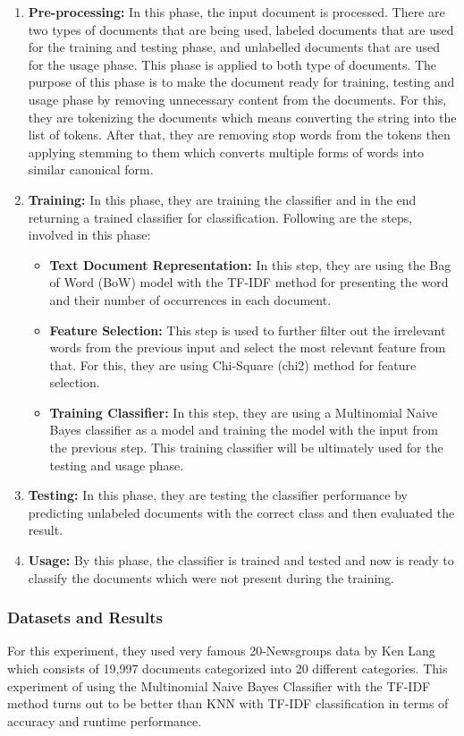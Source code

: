\begin{enumerate}
   \item \textbf{Pre-processing:} In this phase, the input document is processed. There are two types of documents that are being used, labeled documents that are used for the training and testing phase, and unlabelled documents that are used for the usage phase. This phase is applied to both type of documents. The purpose of this phase is to make the document ready for training, testing and usage phase by removing unnecessary content from the documents. For this, they are tokenizing the documents which means converting the string into the list of tokens. After that, they are removing stop words from the tokens then applying stemming to them which converts multiple forms of words into similar canonical form.
   \item \textbf{Training:} In this phase, they are training the classifier and in the end returning a trained classifier for classification. Following are the steps, involved in this phase:
   \begin{itemize}
     \item \textbf{Text Document Representation:} In this step, they are using the Bag of Word (BoW) model with the TF-IDF method for presenting the word and their number of occurrences in each document.
     \item \textbf{Feature Selection:} This step is used to further filter out the irrelevant words from the previous input and select the most relevant feature from that. For this, they are using Chi-Square (chi2) \cite{chi2} method for feature selection.
     \item \textbf{Training Classifier:} In this step, they are using a Multinomial Naive Bayes classifier as a model and training the model with the input from the previous step. This training classifier will be ultimately used for the testing and usage phase.
   \end{itemize}
   \item \textbf{Testing:} In this phase, they are testing the classifier performance by predicting unlabeled documents with the correct class and then evaluated the result.
   \item \textbf{Usage:} By this phase, the classifier is trained and tested and now is ready to classify the documents which were not present during the training.
\end{enumerate}
\par
\subsubsection{Datasets and Results}
For this experiment, they used very famous 20-Newsgroups data by Ken Lang \cite{20_news_grp_data} which consists of 19,997 documents categorized into 20 different categories. This experiment of using the Multinomial Naive Bayes Classifier with the TF-IDF method turns out to be better than KNN with TF-IDF classification in terms of accuracy and runtime performance.
\par
